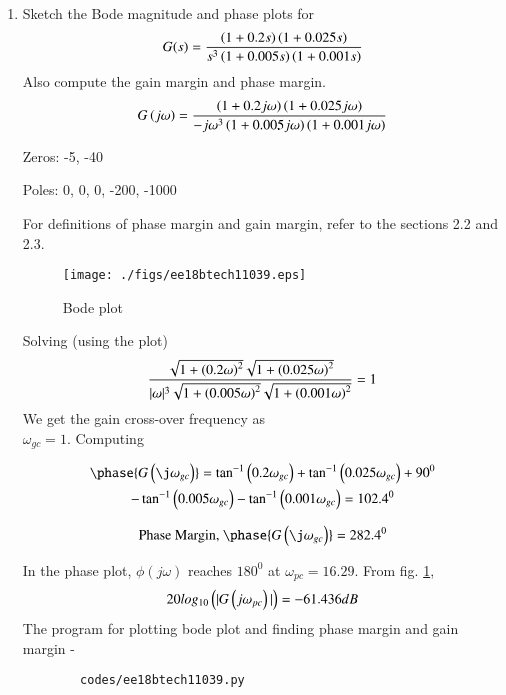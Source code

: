 \begin{enumerate}[label=\thesubsection.\arabic*.,ref=\thesubsection.\theenumi]
    
    \item Sketch the Bode magnitude and phase plots for 
    \begin{align}
        G(s) = \frac{\left(1+0.2s\right)\left(1+0.025s\right)}{s^3\left(1+0.005s\right)\left(1+0.001s\right)}
    \end{align}
    Also compute the gain margin and phase margin.\\
    \solution
    \begin{align}
        G\left(j\omega\right) = \frac{\left(1+0.2j\omega\right)\left(1+0.025j\omega\right)}{-j\omega^3\left(1+0.005j\omega\right)\left(1+0.001j\omega\right)}
    \end{align}
    
    Zeros: -5, -40
    
    Poles: 0, 0, 0, -200, -1000
    
    For definitions of phase margin and gain margin, refer to the sections 2.2 and 2.3.
    
    \begin{figure}[!h]
    \centering
      \texttt{[image: ./figs/ee18btech11039.eps]}
      \caption{Bode plot}
      \label{fig:ee18btech11039}
    \end{figure}
    
    Solving (using the plot)
    \begin{align}
        \frac{\sqrt{1+\left(0.2\omega\right)^2} \sqrt{1+\left(0.025\omega\right)^2}}{|\omega|^3 \sqrt{1+\left(0.005\omega\right)^2} \sqrt{1+\left(0.001\omega\right)^2}} = 1
    \end{align}
    We get the gain cross-over frequency as \\ $\omega _{gc} = 1$. 
    Computing 
    
        \begin{multline}
            \phase{G\brak{\j\omega_{gc}}} = \tan^{-1}\brak{0.2\omega_{gc}}+\tan^{-1}\brak{0.025\omega_{gc}}+90^0\\
            -\tan^{-1}\brak{0.005\omega_{gc}}-\tan^{-1}\brak{0.001\omega_{gc}}
            = 102.4^0
        \end{multline}
    
    \begin{align}
    \text{Phase Margin, } \phase{G\brak{\j\omega_{gc}}} = 282.4^0
    \end{align}
    
    In the phase plot, $\phi(j\omega)$ reaches $180^0$ at $\omega_{pc} = 16.29$. From fig. \ref{fig:ee18btech11039}, 
    \begin{align}
        20log_{10}\left(|G\left(j\omega_{pc}\right)|\right) = -61.436 dB
    \end{align}
    The program for plotting bode plot and finding phase margin and gain margin -
    \begin{lstlisting}
        codes/ee18btech11039.py
    \end{lstlisting}
    
    \end{enumerate}
    
    
